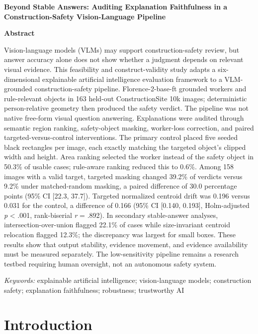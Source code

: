 \documentclass[12pt,letterpaper,twoside]{article}
\begin{document}
\begin{center}
\textbf{Beyond Stable Answers: Auditing Explanation Faithfulness in a Construction-Safety Vision-Language Pipeline}
\end{center}

\begin{center}
\textbf{Abstract}
\end{center}

Vision-language models (VLMs) may support construction-safety review, but answer accuracy alone does not show whether a judgment depends on relevant visual evidence. This feasibility and construct-validity study adapts a six-dimensional explainable artificial intelligence evaluation framework to a VLM-grounded construction-safety pipeline. Florence-2-base-ft grounded workers and rule-relevant objects in 163 held-out ConstructionSite 10k images; deterministic person-relative geometry then produced the safety verdict. The pipeline was not native free-form visual question answering. Explanations were audited through semantic region ranking, safety-object masking, worker-loss correction, and paired targeted-versus-control interventions. The primary control placed five seeded black rectangles per image, each exactly matching the targeted object's clipped width and height. Area ranking selected the worker instead of the safety object in 50.3\% of usable cases; rule-aware ranking reduced this to 0.6\%. Among 158 images with a valid target, targeted masking changed 39.2\% of verdicts versus 9.2\% under matched-random masking, a paired difference of 30.0 percentage points (95\% CI [22.3, 37.7]). Targeted normalized centroid drift was 0.196 versus 0.031 for the control, a difference of 0.166 (95\% CI [0.140, 0.193], Holm-adjusted \textit{p} < .001, rank-biserial \textit{r} = .892). In secondary stable-answer analyses, intersection-over-union flagged 22.1\% of cases while size-invariant centroid relocation flagged 12.3\%; the discrepancy was largest for small boxes. These results show that output stability, evidence movement, and evidence availability must be measured separately. The low-sensitivity pipeline remains a research testbed requiring human oversight, not an autonomous safety system.

\noindent\textit{Keywords:} explainable artificial intelligence; vision-language models; construction safety; explanation faithfulness; robustness; trustworthy AI

\section{Introduction}
\end{document}
